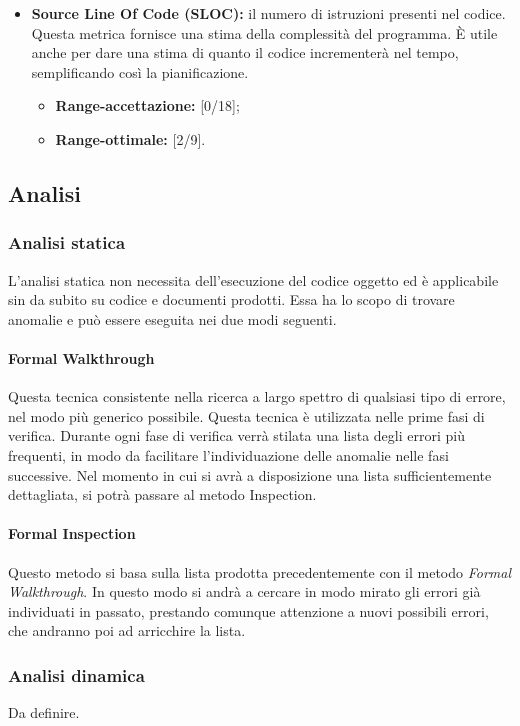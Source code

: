 \begin{itemize}
			\item \textbf{Source Line Of Code (SLOC): }il numero di istruzioni presenti nel codice. Questa metrica fornisce una stima della complessità del programma. È utile anche per dare una stima di quanto il codice incrementerà nel tempo, semplificando così la pianificazione.
			
			\begin{itemize}
				\item \textbf{Range-accettazione: }[0/18];
				\item \textbf{Range-ottimale: }[2/9].
			\end{itemize}
			
		\end{itemize}
	
	
	\subsection{Analisi}
	
	\subsubsection{Analisi statica}
	L'analisi statica non necessita dell'esecuzione del codice oggetto ed è applicabile sin da subito su codice e documenti prodotti. Essa ha lo scopo di trovare anomalie e può essere eseguita nei due modi seguenti.
	
	\paragraph{Formal Walkthrough}
	Questa tecnica consistente nella ricerca a largo spettro di qualsiasi tipo di errore, nel modo più generico possibile. 
	Questa tecnica è utilizzata nelle prime fasi di verifica. Durante ogni fase di verifica verrà stilata una lista degli errori più frequenti, in modo da facilitare l’individuazione delle anomalie nelle fasi successive. 
	Nel momento in cui si avrà a disposizione una lista sufficientemente dettagliata, si potrà passare al metodo Inspection.
	
	
	\paragraph{Formal Inspection}
	Questo metodo si basa sulla lista prodotta precedentemente con il metodo \textit{Formal Walkthrough}. In questo modo si andrà a cercare in modo mirato gli errori già individuati in passato, prestando comunque attenzione a nuovi possibili errori, che andranno poi ad arricchire la lista.
	
	
	\subsubsection{Analisi dinamica}
	Da definire.
	
	
	
	
	